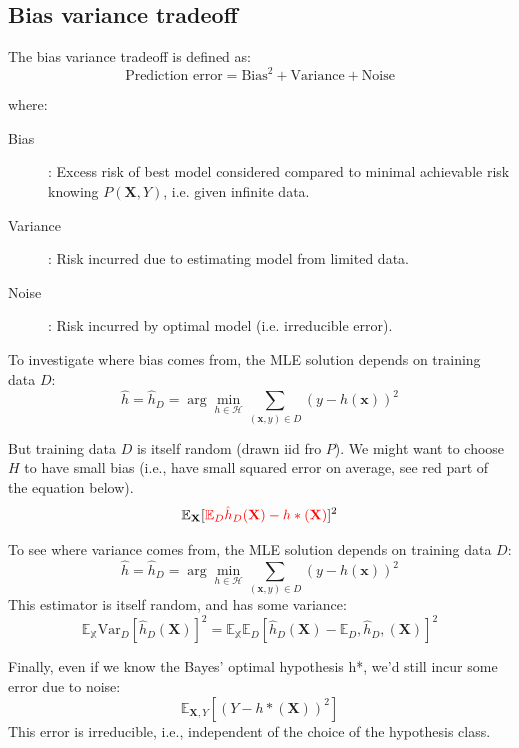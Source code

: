 \documentclass[a4paper,10pt,twoside]{article}
\makeatletter
\def\mathcolor#1#{\@mathcolor{#1}}
\def\@mathcolor#1#2#3{%
  \protect\leavevmode
  \begingroup
    \color#1{#2}#3%
  \endgroup
}
\makeatother
\begin{document}
\subsection{Bias variance tradeoff}
\begin{redbox}{}
    The bias variance tradeoff is defined as:
    \begin{equation*}
        \text{Prediction error} = \text{Bias}^2+\text{Variance} + \text{Noise}
    \end{equation*}
\end{redbox}
where:
\begin{description}
    \item[Bias]: Excess risk of best model considered compared to minimal achievable risk knowing $P(\textbf{X},Y)$, i.e. given infinite data.
    \item[Variance]: Risk incurred due to estimating model from limited data.
    \item[Noise]: Risk incurred by optimal model (i.e. irreducible error).
\end{description}

To investigate where bias comes from, the MLE solution depends on training data $D$:
\begin{equation*}
    \hat{h} = \hat{h}_D=\arg\min_{h\in\mathcal{H}}\sum_{(\mathbf{x},y)\in D}(y-h(\mathbf{x}))^2
\end{equation*}

But training data $D$ is itself random (drawn iid fro $P$). We might want to choose $H$ to have small bias (i.e., have small squared error on average, see red part of the equation below).
\begin{equation*}
    \mathbb{E}_{\mathbf{X}}[\mathcolor{red}{\mathbb{E}_D\hat{h}_D(\mathbf{X})-h*(\mathbf{X})}]^2
\end{equation*}

To see where variance comes from, the MLE solution depends on training data $D$:
\begin{equation*}
    \hat{h} = \hat{h}_D=\arg\min_{h\in\mathcal{H}}\sum_{(\mathbf{x},y)\in D}(y-h(\mathbf{x}))^2
\end{equation*}
This estimator is itself random, and has some variance:
\begin{equation*}
    \mathbb{E}_{\mathbb{X}}\text{Var}_D[\hat{h}_D(\mathbf{X})]^2 = \mathbb{E}_{\mathbb{X}}\mathbb{E}_{D}[\hat{h}_D(\mathbf{X})-\mathbb{E}_{D},\hat{h}_D,(\mathbf{X})]^2
\end{equation*}

Finally, even if we know the Bayes' optimal hypothesis h*, we'd still incur some error due to noise:
\begin{equation*}
    \mathbb{E}_{\mathbf{X},Y}[(Y-h*(\mathbf{X}))^2]
\end{equation*}
This error is irreducible, i.e., independent of the choice of the hypothesis class.
\end{document}
